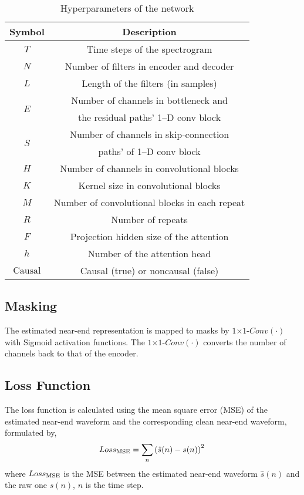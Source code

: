 \documentclass{article}
\begin{document}
\begin{sloppy}
\begin{table}[htb]
\setlength{\abovecaptionskip}{0.2cm}
\setlength{\belowcaptionskip}{0.2cm}
\centering
\caption{Hyperparameters of the network}
\label{tab:configuration}
\begin{tabular}{c|c}
\hline
\textbf{Symbol} & \textbf{Description} \\ \hline \hline
$T$ & Time steps of the spectrogram \\ \hline
$N$ & Number of filters in encoder and decoder \\ \hline
$L$ & Length of the filters (in samples) \\ \hline
\multirow{2}{*}{$E$} & Number of channels in bottleneck and \\
  & the residual paths' 1--D conv block \\ \hline
\multirow{2}{*}{$S$} & Number of channels in skip-connection \\
                    & paths' of 1--D conv block \\ \hline
$H$ & Number of channels in convolutional blocks \\ \hline
$K$ & Kernel size in convolutional blocks \\ \hline
$M$ & Number of convolutional blocks in each repeat \\ \hline
$R$ & Number of repeats \\ \hline
$F$ & Projection hidden size of the attention \\ \hline
$h$ & Number of the attention head \\ \hline
$\text{Causal}$ & Causal (true) or noncausal (false) \\ \hline
\end{tabular}
\end{table}

\subsection{Masking}
The estimated near-end representation is mapped to masks by $1$$\times $$1$-$Conv(\cdot)$ with Sigmoid activation functions. The $1$$\times $$1$-$Conv(\cdot)$ converts the number of channels back to that of the encoder.


\subsection{Loss Function}
\label{sec:loss_cun}
The loss function is calculated using the mean square error (MSE) of the estimated near-end waveform and the corresponding clean near-end waveform, formulated by,
\begin{equation} \label{eq:mask_loss}
{Loss_{\rm{MSE}}} = \sum_{n}\left(\hat{s}(n)-s(n)\right)^{2} \\
\end{equation}
where ${Loss_{\rm{MSE}}}$ is the MSE between the estimated near-end waveform $\hat{s}(n)$ and the raw one ${s}(n)$, $n$ is the time step.



\end{sloppy}
\end{document}
